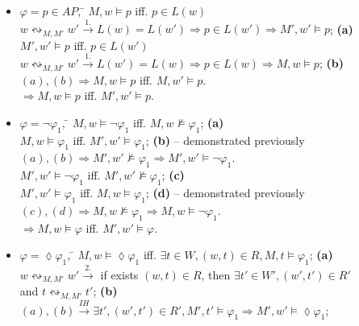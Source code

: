 \documentclass[10pt,a4paper]{article}
\begin{document}
\begin{itemize}

\item
\begin{tabbing}
$\varphi = p \in AP$, \= $M, w \models p$ iff. $p \in L(w)$\\
\> $w\leftrightsquigarrow_{M, M'}w' \xrightarrow{1.} L(w) = L(w') \Rightarrow p \in L(w') \Rightarrow M', w' \models p$; \textbf{(a)}\\
\> $M', w' \models p$ iff. $p \in L(w')$\\
\> $w\leftrightsquigarrow_{M, M'}w' \xrightarrow{1.} L(w') = L(w) \Rightarrow p \in L(w) \Rightarrow M, w \models p$; \textbf{(b)}\\
\> $(a),(b)\Rightarrow M, w \models p$ iff. $M, w' \models p$.\\
$\Rightarrow M, w \models p$ iff. $M', w' \models p$.
\end{tabbing}
\item
\begin{tabbing}
$\varphi = \neg \varphi_1$, \= $M, w \models \neg \varphi_1$ iff. $M, w \not \models \varphi_1$; \textbf{(a)}\\
\> $M, w \models \varphi_1$ iff. $M', w' \models \varphi_1$; \textbf{(b)} -- demonstrated previously\\
\> $(a), (b) \Rightarrow M', w' \not \models \varphi_1 \Rightarrow M', w' \models \neg \varphi_1$.\\
\> $M', w' \models \neg \varphi_1$ iff. $M', w' \not \models \varphi_1$; \textbf{(c)}\\
\> $M', w' \models \varphi_1$ iff. $M, w \models \varphi_1$; \textbf{(d)} -- demonstrated previously\\
\> $(c), (d) \Rightarrow M, w \not \models \varphi_1 \Rightarrow M, w \models \neg \varphi_1$.\\
$\Rightarrow M, w \models \varphi$ iff. $M', w' \models \varphi$.
\end{tabbing}
\item
\begin{tabbing}
$\varphi = \lozenge \varphi_1$, \= $M, w \models \lozenge \varphi_1$ iff. $\exists t \in W, (w, t) \in R, M, t \models \varphi_1$; \textbf{(a)}\\
\> $w\leftrightsquigarrow_{M, M'} w' \xrightarrow{2.}$ if exists $(w, t) \in R$, then $\exists t' \in W', (w', t') \in R'$\\
\> and $t \leftrightsquigarrow_{M, M'} t'$; \textbf{(b)}\\
\> $(a), (b) \xrightarrow{IH} \exists t',(w', t') \in R', M', t' \models \varphi_1 \Rightarrow M', w' \models \lozenge \varphi_1$;\\

\end{tabbing}
\end{itemize}
\end{document}
